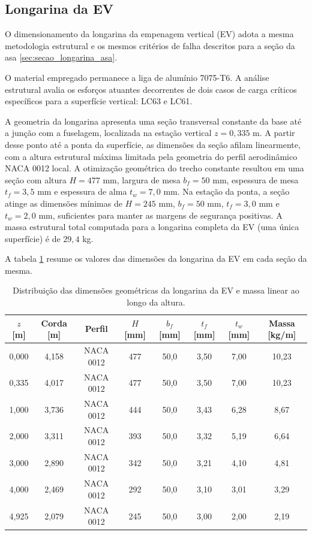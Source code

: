 \subsection{Longarina da EV}

O dimensionamento da longarina da empenagem vertical (EV) adota a mesma metodologia estrutural e os mesmos critérios de falha descritos para a seção da asa \ref{sec:secao_longarina_asa}. 

O material empregado permanece a liga de alumínio 7075-T6. A análise estrutural avalia os esforços atuantes decorrentes de dois casos de carga críticos específicos para a superfície vertical: LC63 e LC61.

A geometria da longarina apresenta uma seção transversal constante da base até a junção com a fuselagem, localizada na estação vertical $z = 0,335$ m. A partir desse ponto até a ponta da superfície, as dimensões da seção afilam linearmente, com a altura estrutural máxima limitada pela geometria do perfil aerodinâmico NACA 0012 local. A otimização geométrica do trecho constante resultou em uma seção com altura $H = 477$ mm, largura de mesa $b_f = 50$ mm, espessura de mesa $t_f = 3,5$ mm e espessura de alma $t_w = 7,0$ mm. Na estação da ponta, a seção atinge as dimensões mínimas de $H = 245$ mm, $b_f = 50$ mm, $t_f = 3,0$ mm e $t_w = 2,0$ mm, suficientes para manter as margens de segurança positivas. A massa estrutural total computada para a longarina completa da EV (uma única superfície) é de $29,4$ kg.

A tabela \ref{tab:longarina_ev_resultados} resume os valores das dimensões da longarina da EV em cada seção da mesma.

\begin{table}[H]
    \centering
    \caption{Distribuição das dimensões geométricas da longarina da EV e massa linear ao longo da altura.}
    \vspace{0.2cm}
    \begin{tabular}{cccccccc}
        \hline
        \textbf{$z$ [m]} & \textbf{Corda [m]} & \textbf{Perfil} & \textbf{$H$ [mm]} & \textbf{$b_f$ [mm]} & \textbf{$t_f$ [mm]} & \textbf{$t_w$ [mm]} & \textbf{Massa [kg/m]} \\
        \hline
        0,000 & 4,158 & NACA 0012 & 477 & 50,0 & 3,50 & 7,00 & 10,23 \\
        0,335 & 4,017 & NACA 0012 & 477 & 50,0 & 3,50 & 7,00 & 10,23 \\
        1,000 & 3,736 & NACA 0012 & 444 & 50,0 & 3,43 & 6,28 & 8,67 \\
        2,000 & 3,311 & NACA 0012 & 393 & 50,0 & 3,32 & 5,19 & 6,64 \\
        3,000 & 2,890 & NACA 0012 & 342 & 50,0 & 3,21 & 4,10 & 4,81 \\
        4,000 & 2,469 & NACA 0012 & 292 & 50,0 & 3,10 & 3,01 & 3,29 \\
        4,925 & 2,079 & NACA 0012 & 245 & 50,0 & 3,00 & 2,00 & 2,19 \\
        \hline
    \end{tabular}
    \label{tab:longarina_ev_resultados}
\end{table}

